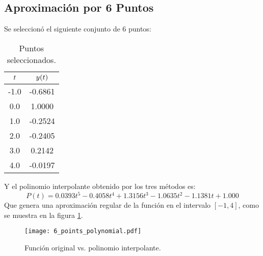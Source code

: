 \subsection{Aproximación por 6 Puntos}
Se seleccionó el siguiente conjunto de 6 puntos:
\begin{table}[H]
\centering
\begin{tabular}{cc}
\hline
$\boldmath{t}$ & $\boldmath{y(t)}$ \\ \hline
-1.0           & -0.6861           \\
0.0            & 1.0000            \\
1.0            & -0.2524           \\
2.0            & -0.2405           \\
3.0            & 0.2142            \\
4.0            & -0.0197           \\ \hline
\end{tabular}
\caption{Puntos seleccionados.}
\label{tab:6points}
\end{table}
Y el polinomio interpolante obtenido por los tres métodos es:
\begin{equation}
    P(t)=0.0393 t^5 - 0.4058 t^4 + 1.3156 t^3 - 1.0635 t^2 - 1.1381 t + 1.000
\end{equation}
Que genera una aproximación regular de la función en el intervalo $[-1,4]$, como se muestra en la figura \ref{fig:graph6points}.
\begin{figure}[H]
    \centering
    \texttt{[image: 6\_points\_polynomial.pdf]}
    \caption{Función original vs. polinomio interpolante.}
    \label{fig:graph6points}
\end{figure}


